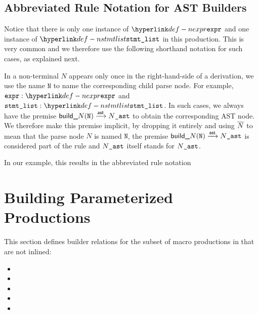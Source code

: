 \subsection{Abbreviated Rule Notation for AST Builders}
Notice that there is only one instance of $\Nexpr$ and one instance of $\Nstmtlist$ in this production.
This is very common and we therefore use the following shorthand notation for such cases, as explained next.

In a non-terminal $N$ appears only once in the right-hand-side of a derivation,
we use the name $\texttt{N}$ to name the corresponding child parse node.
For example, $\namednode{\vexpr}{\Nexpr}$ and $\namednode{\vstmtlist}{\Nstmtlist}$.
In such cases, we always have the premise $\textsf{build\_}N(\texttt{N}) \astarrow \astversion{N}$
to obtain the corresponding AST node.
We therefore make this premise implicit, by dropping it entirely and using $\astof{N}$ to mean that
the parse node $N$ is named $\texttt{N}$, the premise $\textsf{build\_}N(\texttt{N}) \astarrow \astversion{N}$
is considered part of the rule and $\astversion{N}$ itself stands for $\astversion{N}$.

In our example, this results in the abbreviated rule notation
\begin{mathpar}
\end{mathpar}

\section{Building Parameterized Productions\label{sec:BuildingParameterizedProductions}}
This section defines builder relations for the
subset of macro productions in 
that are not inlined:
\begin{itemize}
  \item {}
  \item {}
  \item {}
  \item {}
  \item {}
\end{itemize}

